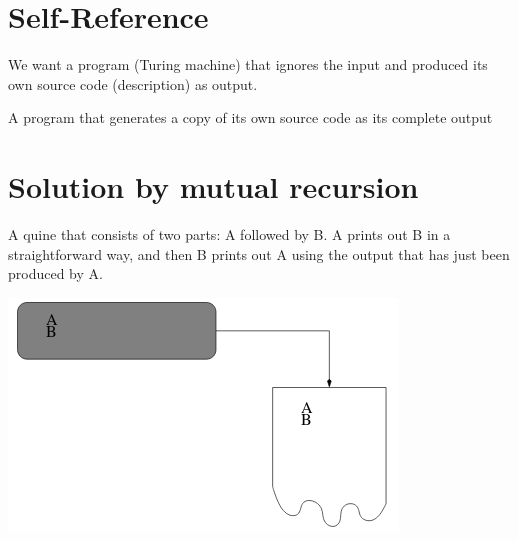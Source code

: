 \documentclass{article}[18pt]
\begin{document}
\section{Self-Reference}
We want a program (Turing machine) that ignores the input and produced its own source code (description) as output.
\begin{defin}[Quine]
A program that generates a copy of its own source code as its complete output
\end{defin}
\section{Solution by mutual recursion}
A quine that consists of two parts: A followed by B. A prints out B in a straightforward way, and then B prints out A using the output that has just been produced by A.
\begin{center}
	\includegraphics[scale=0.7]{"Mutual Recursion"}
\end{center}
\end{document}
